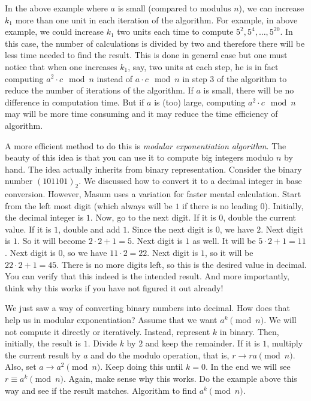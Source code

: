 \documentclass{subfile}
\begin{document}
	\begin{remark}
		In the above example where $a$ is small (compared to modulus $n$), we can increase $k_1$ more than one unit in each iteration of the algorithm. For example, in above example, we could increase $k_1$ two units each time to compute $5^2, 5^4,\ldots, 5^{20}$. In this case, the number of calculations is divided by two and therefore there will be less time needed to find the result. This is done in general case but one must notice that when one increases $k_1$, say, two units at each step, he is in fact computing $a^2 \cdot c \mod n$ instead of $a \cdot c \mod n$ in step $3$ of the algorithm to reduce the number of iterations of the algorithm. If $a$ is small, there will be no difference in computation time. But if $a$ is (too) large, computing $a^2 \cdot c \mod n$ may will be more time consuming and it may reduce the time efficiency of algorithm.
	\end{remark}
	
	A more efficient method to do this is \textit{modular exponentiation algorithm}. The beauty of this idea is that you can use it to compute big integers modulo $n$ by hand. The idea actually inherits from binary representation. Consider the binary number $(101101)_2$. We discussed how to convert it to a decimal integer in base conversion. However, Masum uses a variation for faster mental calculation. Start from the left most digit (which always will be $1$ if there is no leading $0$). Initially, the decimal integer is $1$. Now, go to the next digit. If it is $0$, double the current value. If it is $1$, double and add $1$. Since the next digit is $0$, we have $2$. Next digit is $1$. So it will become $2\cdot2+1=5$. Next digit is $1$ as well. It will be $5\cdot2+1=11$. Next digit is $0$, so we have $11\cdot2=22$. Next digit is $1$, so it will be $22\cdot2+1=45$. There is no more digits left, so this is the desired value in decimal. You can verify that this indeed is the intended result. And more importantly, think why this works if you have not figured it out already!
	
	We just saw a way of converting binary numbers into decimal. How does that help us in modular exponentiation? Assume that we want $a^k\pmod n$. We will not compute it directly or iteratively. Instead, represent $k$ in binary. Then, initially, the result is $1$. Divide $k$ by $2$ and keep the remainder. If it is $1$, multiply the current result by $a$ and do the modulo operation, that is, $r\to ra\pmod n$. Also, set $a\to a^2\pmod n$. Keep doing this until $k=0$. In the end we will see $r\equiv a^k\pmod n$. Again, make sense why this works. Do the example above this way and see if the result matches. Algorithm to find $a^k\pmod n$.
\end{document}
